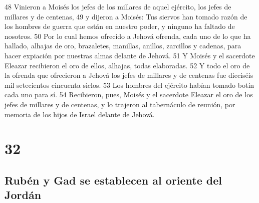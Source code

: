 48 Vinieron a Moisés los jefes de los millares de aquel ejército, los jefes de millares y de centenas,
49 y dijeron a Moisés: Tus siervos han tomado razón de los hombres de guerra que están en nuestro poder, y ninguno ha faltado de nosotros.
50 Por lo cual hemos ofrecido a Jehová ofrenda, cada uno de lo que ha hallado, alhajas de oro, brazaletes, manillas, anillos, zarcillos y cadenas, para hacer expiación por nuestras almas delante de Jehová.
51 Y Moisés y el sacerdote Eleazar recibieron el oro de ellos, alhajas, todas elaboradas.
52 Y todo el oro de la ofrenda que ofrecieron a Jehová los jefes de millares y de centenas fue dieciséis mil setecientos cincuenta siclos.
53 Los hombres del ejército habían tomado botín cada uno para sí.
54 Recibieron, pues, Moisés y el sacerdote Eleazar el oro de los jefes de millares y de centenas, y lo trajeron al tabernáculo de reunión, por memoria de los hijos de Israel delante de Jehová.

\chapter{32}

\section*{Rubén y Gad se establecen al oriente del Jordán}

